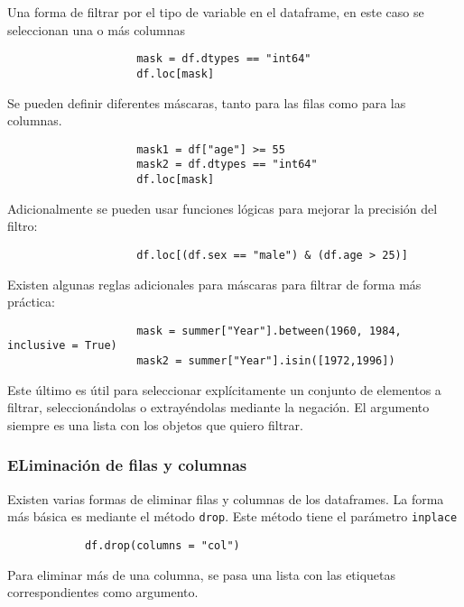 Una forma de filtrar por el tipo de variable en el dataframe, en este caso se
seleccionan una o más columnas

\begin{verbatim}
                    mask = df.dtypes == "int64"
                    df.loc[mask]    
                    \end{verbatim}

Se pueden definir diferentes máscaras, tanto para las filas como para las
columnas.

\begin{verbatim}
                    mask1 = df["age"] >= 55
                    mask2 = df.dtypes == "int64"
                    df.loc[mask]    
                    \end{verbatim}

Adicionalmente se pueden usar funciones lógicas para mejorar la precisión del
filtro:
\begin{verbatim}
                    df.loc[(df.sex == "male") & (df.age > 25)]    
                    \end{verbatim}

Existen algunas reglas adicionales para máscaras para filtrar de forma más
práctica:

\begin{verbatim}
                    mask = summer["Year"].between(1960, 1984, inclusive = True)
                    mask2 = summer["Year"].isin([1972,1996])
                    \end{verbatim}

Este último es útil para seleccionar explícitamente un conjunto de elementos a
filtrar, seleccionándolas o extrayéndolas mediante la negación. El argumento
siempre es una lista con los objetos que quiero filtrar.

\subsubsection{ELiminación de filas y columnas}

Existen varias formas de eliminar filas y columnas de los dataframes. La forma
más básica es mediante el método \texttt{drop}. Este método tiene el parámetro
\texttt{inplace}

\begin{verbatim}
            df.drop(columns = "col")    
            \end{verbatim}

Para eliminar más de una columna, se pasa una lista con las etiquetas
correspondientes como argumento.

